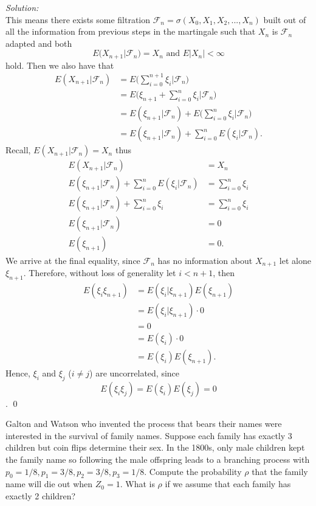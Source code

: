 \documentclass[10pt]{amsart}
\begin{document}
\noindent
\textit{Solution:} \\
This means there exists some filtration $\mathcal F_n = \sigma(X_0, X_1, X_2, ..., X_n)$ built out of all the information from previous steps in the martingale such that $X_n$ is $\mathcal F_n$ adapted and both
$$E (X_{n + 1} | \mathcal F_n) = X_n \text{ and }E |X_n| < \infty$$
hold.
Then we also have that
\begin{align*}
E (X_{n + 1} | \mathcal F_n) &= E\bigg( \sum_{i=0}^{n+1} \xi_i \bigg| \mathcal F_n \bigg) \\
	&= E\bigg( \xi_{n + 1} + \sum_{i=0}^n \xi_i \bigg| \mathcal F_n \bigg) \\
	&= E ( \xi_{n + 1} | \mathcal F_n ) + E\bigg( \sum_{i=0}^n \xi_i \bigg| \mathcal F_n \bigg) \\
	&= E ( \xi_{n + 1} | \mathcal F_n ) + \sum_{i=0}^n E( \xi_i | \mathcal F_n).
\end{align*}
Recall, $E (X_{n + 1} | \mathcal F_n) = X_n$ thus
\begin{align*}
E (X_{n + 1} | \mathcal F_n) &= X_n \\
E ( \xi_{n + 1} | \mathcal F_n ) + \sum_{i=0}^n E( \xi_i | \mathcal F_n) &= \sum_{i=0}^n \xi_i \\
E ( \xi_{n + 1} | \mathcal F_n ) + \sum_{i=0}^n \xi_i &= \sum_{i=0}^n \xi_i \\
E ( \xi_{n + 1} | \mathcal F_n ) &= 0 \\
E ( \xi_{n + 1}) &= 0.
\end{align*}
We arrive at the final equality, since $\mathcal F_n$ has no information about $X_{n + 1}$ let alone $\xi_{n + 1}$.
Therefore, without loss of generality let $ i < n + 1$, then 
\begin{align*}
E(\xi_i\xi_{n + 1})
	&= E(\xi_i | \xi_{n + 1}) E(\xi_{n + 1}) \\
	&= E(\xi_i | \xi_{n + 1}) \cdot 0 \\
	&= 0 \\
	&= E(\xi_i) \cdot 0 \\
	&= E(\xi_i)E(\xi_{n + 1}).
\end{align*}
Hence, $\xi_i$ and $\xi_j$ ($i\neq j$) are uncorrelated, since
$$E(\xi_i\xi_j) = E(\xi_i)E(\xi_j) = 0$$.
\qed \\

\newpage

 Galton and Watson who invented the process that bears their names were interested in the survival of family names. Suppose each family has exactly 3 children but coin flips determine their sex. In the 1800s, only male children kept the family name so following the male offspring leads to a branching process with $p_0 = 1/8, p_1 = 3/8, p_2 = 3/8, p_3 = 1/8$. Compute the probability $\rho$ that the family name will die out when $Z_0 = 1$. What is $\rho$ if we assume that each family has exactly 2 children? \\
\end{document}
